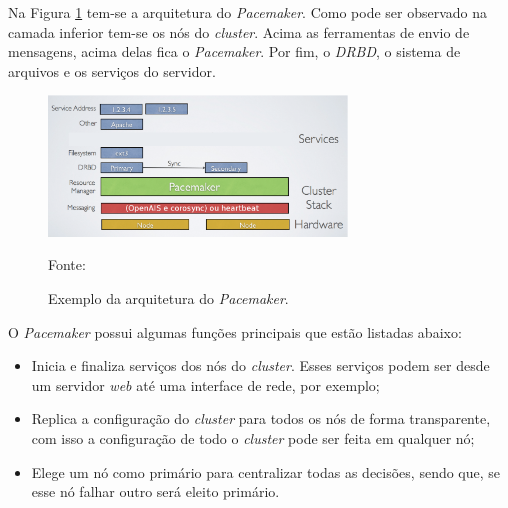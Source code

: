 
Na Figura \ref{fig:pacemaker_tools} tem-se a arquitetura do \textit{Pacemaker}. Como pode ser observado na camada inferior tem-se os nós do 
\textit{cluster}. Acima as ferramentas de envio de mensagens, acima delas fica o \textit{Pacemaker}. Por fim, o \textit{DRBD}, o sistema de 
arquivos e os serviços do servidor.

\begin{figure}[h!]
 \centering
 \includegraphics[width=300px]{img/pacemaker_tools.eps}
 \caption{Exemplo da arquitetura do \textit{Pacemaker}.}
 Fonte: \citet{pacemaker}
 \label{fig:pacemaker_tools}
\end{figure}

O \textit{Pacemaker} possui algumas funções principais que estão listadas abaixo:
\begin{itemize}
 \item Inicia e finaliza serviços dos nós do \textit{cluster}. Esses serviços podem ser desde um servidor \textit{web} até uma interface de 
 rede, por exemplo;
 \item Replica a configuração do \textit{cluster} para todos os nós de forma transparente, com isso a configuração de todo o \textit{cluster} 
 pode ser feita em qualquer nó;
 \item Elege um nó como primário para centralizar todas as decisões, sendo que, se esse nó falhar outro será eleito primário.
\end{itemize}

